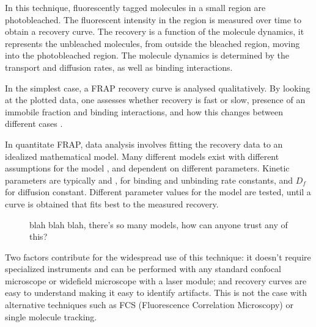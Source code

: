     In this technique, fluorescently tagged molecules in a small region
    are photobleached.  The fluorescent intensity in the region is
    measured over time to obtain a recovery curve.  The recovery is a
    function of the molecule dynamics, it represents the unbleached
    molecules, from outside the bleached region, moving into the
    photobleached region.  The molecule dynamics is determined by the
    transport and diffusion rates, as well as binding interactions.

    In the simplest case, a FRAP recovery curve is analysed
    qualitatively.  By looking at the plotted data, one assesses
    whether recovery is fast or slow, presence of an immobile
    fraction and binding interactions, and how this changes
    between different cases .

    \begin{figure}
      \centering
      \caption{}
      \label{fig:intro:frap-curve-example}
    \end{figure}

    In quantitate FRAP, data analysis involves fitting the recovery
    data to an idealized mathematical model.
    Many different models exist with different assumptions for the model
    , and dependent on different
    parameters.
    Kinetic parameters are typically \Kon{} and \Koff{}, for
    binding and unbinding rate constants, and $D_{f}$ for diffusion constant.
    Different parameter values for the model are tested, until a curve is
    obtained that fits best to the measured recovery.

    \begin{figure}
      \centering
      \caption{blah blah blah, there's so many models, how can anyone trust
               any of this?}
      \label{fig:intro:frap-model-components}
    \end{figure}

    Two factors contribute for the widespread use of this technique:
    it doesn't require specialized instruments and can be performed with
    any standard confocal microscope or widefield microscope with a laser
    module; and recovery curves are easy to understand making it easy to
    identify artifacts.  This is not the case with alternative techniques
    such as FCS (Fluorescence Correlation Microscopy) or single molecule
    tracking.


